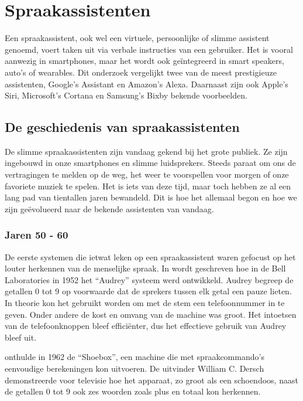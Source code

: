 \section{Spraakassistenten}
Een spraakassistent, ook wel een virtuele, persoonlijke of slimme assistent genoemd, voert taken uit via verbale instructies van een gebruiker. Het is vooral aanwezig in smartphones, maar het wordt ook geïntegreerd in smart speakers, auto's of wearables. Dit onderzoek vergelijkt twee van de meest prestigieuze assistenten, Google’s Assistant en Amazon’s Alexa. Daarnaast zijn ook Apple's Siri, Microsoft's Cortana en Samsung's Bixby bekende voorbeelden.

\subsection{De geschiedenis van spraakassistenten}
\label{s:de geschiedenis van spraakassistenten}
De slimme spraakassistenten zijn vandaag gekend bij het grote publiek. Ze zijn ingebouwd in onze smartphones en slimme luidsprekers. Steeds paraat om ons de vertragingen te melden op de weg, het weer te voorspellen voor morgen of onze favoriete muziek te spelen. Het is iets van deze tijd, maar toch hebben ze al een lang pad van tientallen jaren bewandeld. Dit is hoe het allemaal begon en hoe we zijn geëvolueerd naar de bekende assistenten van vandaag.

\subsubsection{Jaren 50 - 60}
De eerste systemen die ietwat leken op een spraakassistent waren gefocust op het louter herkennen van de menselijke spraak. In \autocite{Vox-Creative2019} wordt geschreven hoe in  de Bell Laboratories in 1952 het ``Audrey'' systeem werd ontwikkeld. Audrey begreep de getallen 0 tot 9 op voorwaarde dat de sprekers tussen elk getal een pauze lieten. In theorie kon het gebruikt worden om met de stem een telefoonnummer in te geven. Onder andere de kost en omvang van de machine was groot. Het intoetsen van de telefoonknoppen bleef efficiënter, dus het effectieve gebruik van Audrey bleef uit.

\autocite{IBM2011} onthulde in 1962 de ``Shoebox'', een machine die met spraakcommando's eenvoudige berekeningen kon uitvoeren. De uitvinder William C. Dersch demonstreerde voor televisie hoe het apparaat, zo groot als een schoendoos, naast de getallen 0 tot 9 ook zes woorden zoals plus en totaal kon herkennen.

